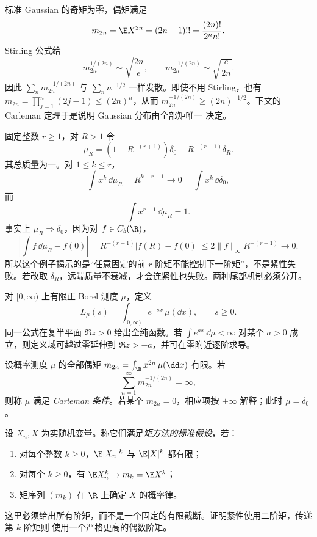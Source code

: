 \begin{example}\label{ex:7-3-3-2}
标准 Gaussian 的奇矩为零，偶矩满足
\[
 m_{2n}=\E X^{2n}=(2n-1)!!=\frac{(2n)!}{2^nn!}.
\]
Stirling 公式给
\[
 m_{2n}^{1/(2n)}\sim\sqrt{\frac{2n}{e}},
 \qquad
 m_{2n}^{-1/(2n)}\sim\sqrt{\frac{e}{2n}}.
\]
因此 $\sum_nm_{2n}^{-1/(2n)}$ 与 $\sum_nn^{-1/2}$ 一样发散。即使不用 Stirling，也有
$m_{2n}=\prod_{j=1}^n(2j-1)\leq(2n)^n$，从而
$m_{2n}^{-1/(2n)}\geq(2n)^{-1/2}$。下文的 Carleman 定理于是说明 Gaussian 分布由全部矩唯一
决定。
\end{example}

\begin{example}[矩收敛但质量问题]\label{ex:7-3-3-3}
固定整数 $r\geq1$，对 $R>1$ 令
\[
 \mu_R=(1-R^{-(r+1)})\delta_0+R^{-(r+1)}\delta_R.
\]
其总质量为一。对 $1\leq k\leq r$，
\[
 \int x^k\,\dd\mu_R=R^{k-r-1}\longrightarrow0
 =\int x^k\,\dd\delta_0,
\]
而
\[
 \int x^{r+1}\,\dd\mu_R=1.
\]
事实上 $\mu_R\Rightarrow\delta_0$，因为对 $f\in C_b(\R)$，
\[
 \left|\int f\,\dd\mu_R-f(0)\right|
 =R^{-(r+1)}|f(R)-f(0)|
 \leq2\|f\|_\infty R^{-(r+1)}\to0.
\]
所以这个例子揭示的是“任意固定的前 $r$ 阶矩不能控制下一阶矩”，不是紧性失败。若改取
$\delta_R$，远端质量不衰减，才会连紧性也失败。两种尾部机制必须分开。
\end{example}

\begin{definition}[Laplace 变换]\label{def:7-3-3-1}
对 $[0,\infty)$ 上有限正 Borel 测度 $\mu$，定义
\[
 L_\mu(s)=\int_{[0,\infty)}e^{-sx}\,\mu(\dd x),\qquad s\geq0.
\]
同一公式在复半平面 $\Re z>0$ 给出全纯函数。若
$\int e^{a x}\,\dd\mu<\infty$ 对某个 $a>0$ 成立，则定义域可越过零延伸到
$\Re z>-a$，并可在零附近逐阶求导。
\end{definition}

\begin{definition}[Carleman 条件]\label{def:7-3-3-2}
设概率测度 $\mu$ 的全部偶矩
$m_{2n}=\int_\R x^{2n}\,\mu(\dd x)$ 有限。若
\begin{equation}\label{eq:7-3-carleman-condition}
 \sum_{n=1}^\infty m_{2n}^{-1/(2n)}=\infty,
\end{equation}
则称 $\mu$ 满足 \emph{Carleman 条件}。若某个 $m_{2n}=0$，相应项按 $+\infty$ 解释；此时
$\mu=\delta_0$。
\end{definition}

\begin{definition}[矩方法的标准假设]\label{def:7-3-3-3}
设 $X_n,X$ 为实随机变量。称它们满足\emph{矩方法的标准假设}，若：
\begin{enumerate}
  \item 对每个整数 $k\geq0$，$\E|X_n|^k$ 与 $\E|X|^k$ 都有限；
  \item 对每个 $k\geq0$，有 $\E X_n^k\to m_k=\E X^k$；
  \item 矩序列 $(m_k)$ 在 $\R$ 上确定 $X$ 的概率律。
\end{enumerate}
这里必须给出所有阶矩，而不是一个固定的有限截断。证明紧性使用二阶矩，传递第 $k$ 阶矩则
使用一个严格更高的偶数阶矩。
\end{definition}

